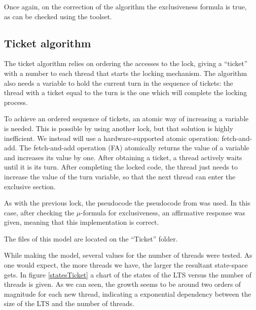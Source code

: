\documentclass[11pt]{article}
\theoremstyle{definition}
\theoremstyle{plain}
\begin{document}
\begin{appendices}
Once again, on the correction of the algorithm the exclusiveness formula is true, as can be checked using the toolset.

\subsection{Ticket algorithm}
The ticket algorithm relies on ordering the accesses to the lock, giving a ``ticket'' with a number to each thread that starts the locking mechanism. The algorithm also needs a variable to hold the current turn in the sequence of tickets: the thread with a ticket equal to the turn is the one which will complete the locking process. 

To achieve an ordered sequence of tickets, an atomic way of increasing a variable is needed. This is possible by using another lock, but that solution is highly inefficient. We instead will use a hardware-supported atomic operation: fetch-and-add. The fetch-and-add operation (FA) atomically returns the value of a variable and increases its value by one. After obtaining a ticket, a thread actively waits until it is its turn. After completing the locked code, the thread just needs to increase the value of the turn variable, so that the next thread can enter the exclusive section.


As with the previous lock, the pseudocode the pseudocode from \cite{andrews2000foundations} was used. In this case, after checking the $ \mu $-formula for exclusiveness, an affirmative response was given, meaning that this implementation is correct.

The files of this model are located on the ``Ticket'' folder.

While making the model, several values for the number of threads were tested. As one would expect, the more threads we have, the larger the resultant state-space gets. In figure \ref{statesTicket} a chart of the states of the LTS versus the number of threads is given. As we can seen, the growth seems to be around two orders of magnitude for each new thread, indicating a exponential dependency between the size of the LTS and the number of threads.

\begin{figure}
\end{figure}
\end{appendices}
\end{document}
